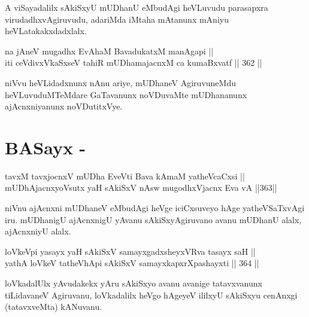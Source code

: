 \begin{artha}
A viSayadalilx sAkiSxyU mUDhanU eMbudAgi heVLuvudu parasapxra
virudadhxvAgiruvudu, adariMda iMtaha mAtanunx mAniyu heVLatakakxdadxlalx.
\end{artha}

\begin{shl}
na jAneV mugadhx EvAhaM BavadukatxM manAgapi || \\
iti ceVdivxVkaSxseV tahiR mUDhamajacnxM ca kumaBxvatf \hfill || 362 ||  
\end{shl}

\begin{artha}
niVvu heVLidadxnunx nAnu ariye, mUDhaneV AgiruvuneMdu heVLuvuduMTeMdare
GaTavanunx noVDuvaMte mUDhananunx ajAcnxniyanunx noVDutitxVye.
\end{artha}

\section*{BASayx -}


\begin{shl}
tavxM tavxjocnxV mUDha EveVti Bava kAmaM yatheVcaCxsi || \\
mUDhAjacnxyoVsutx yaH sAkiSxV nAsw mugodhxV\s jacnx Eva vA \hfill ||363||  
\end{shl}

\begin{artha}
niVnu ajAcnxni mUDhaneV eMbudAgi heVge iciCxsuveyo hAge yatheVSaTxvAgi
iru. mUDhanigU ajAcnxnigU yAvanu sAkiSxyAgiruvano avanu mUDhanU alalx,
ajAcnxniyU alalx.
\end{artha}


\begin{shl}
loVkeV\s pi yasayx yaH sAkiSxV samayxgadxsheyxVRva tasayx saH || \\
yathA loVkeV tatheVhApi sAkiSxV samayxkapxrXpashayxti \hfill || 364 ||  
\end{shl}

\begin{artha}
loVkadalUlx yAvudakekx yAru sAkiSxyo avanu avanige tatavxvanunx
tiLidavaneV Agiruvanu, loVkadalilx heVgo hAgeyeV ililxyU sAkiSxyu
cenAnxgi (tatavxveMta) kANuvanu.
\end{artha}


